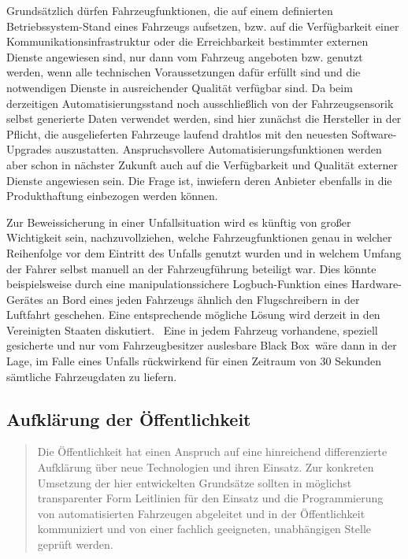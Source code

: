 \documentclass[twoside,a4paper,12pt]{article}
\begin{document}
Grundsätzlich dürfen Fahrzeugfunktionen, die auf einem definierten \glqq Betriebssys\-tem\grqq-Stand eines Fahrzeugs aufsetzen, bzw. auf die 
Verfügbarkeit einer Kommunikationsinfrastruktur oder die Erreichbarkeit bestimmter externen Dienste angewiesen sind, nur dann vom Fahrzeug 
angeboten bzw. genutzt werden, wenn alle technischen Voraussetzungen dafür erfüllt sind und die notwendigen Dienste in ausreichender 
Qualität verfügbar sind. Da beim derzeitigen Automatisierungsstand noch ausschließlich von der Fahrzeugsensorik selbst generierte Daten verwendet werden, 
sind hier zunächst die Hersteller in der Pflicht, die ausgelieferten Fahrzeuge laufend drahtlos mit den neuesten Software-Upgrades auszustatten.
Anspruchsvollere Automatisierungsfunktionen werden aber schon in nächster Zukunft auch auf die Verfügbarkeit und Qualität externer Dienste 
angewiesen sein. Die Frage ist, inwiefern deren Anbieter ebenfalls in die Produkthaftung einbezogen werden können.

Zur Beweissicherung in einer Unfallsituation wird es künftig von großer Wichtigkeit sein, nachzuvollziehen, welche Fahrzeugfunktionen genau in welcher 
Reihenfolge vor dem Eintritt des Unfalls genutzt wurden und in welchem Umfang der Fahrer selbst manuell an der Fahrzeugführung beteiligt war. Dies 
könnte beispielsweise durch eine manipulationssichere Logbuch-Funktion eines Hardware-Gerätes an Bord eines jeden Fahrzeugs ähnlich den Flugschreibern 
in der Luftfahrt geschehen. Eine entsprechende mögliche Lösung wird derzeit in den Vereinigten Staaten diskutiert.~\cite{epic} Eine in jedem Fahrzeug
vorhandene, speziell gesicherte und nur vom Fahrzeugbesitzer auslesbare \glqq Black Box\grqq\ wäre dann in der Lage, im Falle eines Unfalls rückwirkend 
für einen Zeitraum von 30 Sekunden sämtliche Fahrzeugdaten zu liefern.

\subsection{Aufklärung der Öffentlichkeit} \label{AufklaerungDerOeffentlichkeit}

\begin{quote}
\glqq
Die Öffentlichkeit hat einen Anspruch auf eine hinreichend differenzierte Aufklärung
über neue Technologien und ihren Einsatz. Zur konkreten Umsetzung der hier entwickelten Grundsätze sollten in möglichst 
transparenter Form Leitlinien für den Einsatz und die
Programmierung von automatisierten Fahrzeugen abgeleitet und in der Öffentlichkeit
kommuniziert und von einer fachlich geeigneten, unabhängigen Stelle geprüft werden.\grqq\mbox{~\cite[S. 12]{ek}}
\end{quote}
\end{document}
